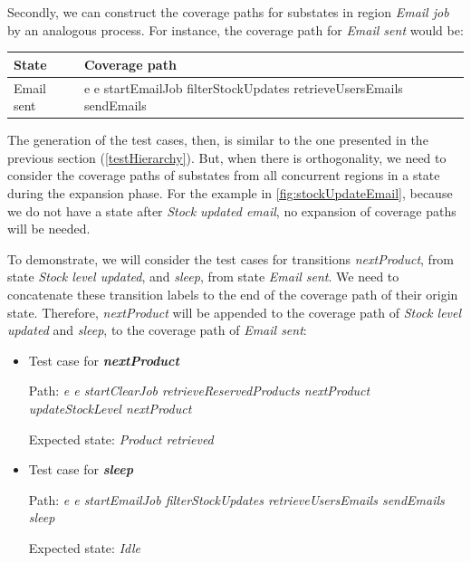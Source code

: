 Secondly, we can construct the coverage paths for substates in region \textit{Email job} by an analogous process. For instance, the coverage path for \textit{Email sent} would be:

\begin{center}
\begin{tabular}{| p{4cm} | p{10cm}|}

\hline

State & Coverage path \\ \hline

Email sent & e e  startEmailJob filterStockUpdates retrieveUsersEmails sendEmails\\ 
\hline
\end{tabular}
\end{center}

The generation of the test cases, then, is similar to the one presented in the previous section (\ref{testHierarchy}). But, when there is orthogonality, we need to consider the coverage paths of substates from all concurrent regions in a state during the expansion phase. For the example in \ref{fig:stockUpdateEmail}, because we do not have a state after \textit{Stock updated email}, no expansion of coverage paths will be needed.

To demonstrate, we will consider the test cases for transitions \textit{nextProduct}, from state \textit{Stock level updated}, and \textit{sleep}, from state \textit{Email sent}. We need to concatenate these transition labels to the end of the coverage path of their origin state. Therefore, \textit{nextProduct} will be appended to the coverage path of \textit{Stock level updated} and \textit{sleep}, to the coverage path of \textit{Email sent}:

\begin{itemize}

\item Test case for \textit{\textbf{nextProduct}}

Path: \textit{e e startClearJob retrieveReservedProducts nextProduct updateStockLevel nextProduct}

Expected state: \textit{Product retrieved}

\item Test case for \textit{\textbf{sleep}}

Path: \textit{e e  startEmailJob filterStockUpdates retrieveUsersEmails sendEmails sleep}

Expected state: \textit{Idle}

\end{itemize}
